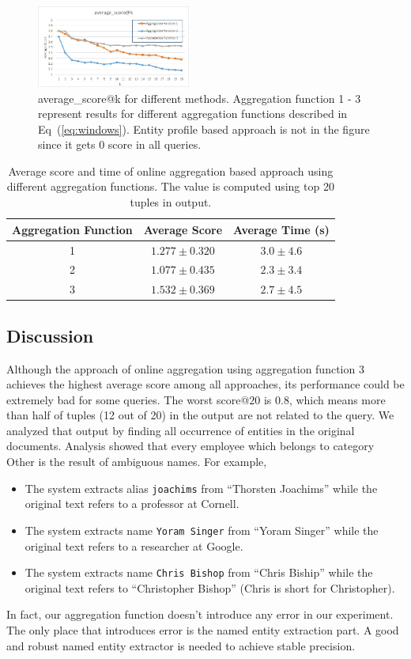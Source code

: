 \documentclass{sig-alternate}
\theoremstyle{definition}
\begin{document}
\begin{figure}[htbp]
\center
\includegraphics[width=0.45\textwidth]{img/score.jpg}
\caption{average\_score@k for different methods. Aggregation function 1 - 3 represent results for different aggregation functions described in Eq~(\ref{eq:windows}). Entity profile based approach is not in the figure since it gets 0 score in all queries.\label{fig:score}}
\end{figure}

\begin{table}[htbp]
\center
\begin{tabular}{|c||c|c|}
  \hline
  Aggregation Function & Average Score & Average Time (s)\\ \hline \hline
  1 & $1.277 \pm 0.320$ & $3.0 \pm 4.6$\\
  2 & $1.077 \pm 0.435$ & $2.3 \pm 3.4$\\
  3 & $1.532 \pm 0.369$ & $2.7 \pm 4.5$\\
  \hline
\end{tabular}\caption{Average score and time of online aggregation based approach using different aggregation functions. The value is computed using top 20 tuples in output.}\label{tbl:score}
\end{table}

\subsection{Discussion}
Although the approach of online aggregation using aggregation function 3 achieves the highest average score among all approaches, its performance could be extremely bad for some queries. The worst score@$20$ is 0.8, which means more than half of tuples (12 out of 20) in the output are not related to the query. We analyzed that output by finding all occurrence of entities in the original documents. Analysis showed that every employee which belongs to category Other is the result of ambiguous names. For example, 
\begin{itemize}
\item The system extracts alias {\tt joachims} from ``Thorsten Joachims'' while the original text refers to a professor at Cornell.
\item The system extracts name {\tt Yoram Singer} from ``Yoram Singer'' while the original text refers to a researcher at Google.
\item The system extracts name {\tt Chris Bishop} from ``Chris Biship'' while the original text refers to ``Christopher Bishop'' (Chris is short for Christopher).
\end{itemize}
In fact, our aggregation function doesn't introduce any error in our experiment. The only place that introduces error is the named entity extraction part. A good and robust named entity extractor is needed to achieve stable precision.
\end{document}
